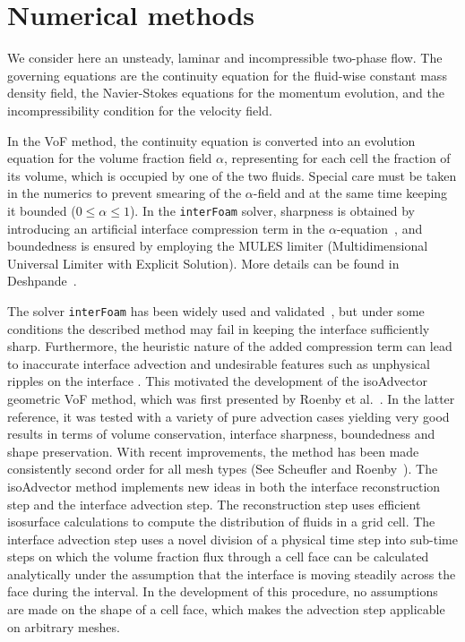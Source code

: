 \documentclass[review]{elsarticle}
\begin{document}
\section{Numerical methods}
We consider here an unsteady, laminar and incompressible two-phase flow. The governing equations are the continuity equation for the fluid-wise constant mass density field, the Navier-Stokes 
equations for the momentum evolution, and the incompressibility condition for the velocity field. 

In the VoF method, the continuity equation is converted into an evolution equation for the volume fraction field $\alpha$, representing for each cell the fraction of its volume, which is occupied by one of the two fluids. Special care must be taken in the numerics to prevent smearing of the $\alpha$-field and at the same time keeping it bounded ($0\leq \alpha\leq 1$). In the \verb|interFoam| solver, sharpness is obtained by introducing an artificial interface compression term in the $\alpha$-equation~\cite{Weller2008}, and boundedness is ensured by employing the MULES limiter (Multidimensional Universal Limiter with Explicit Solution). More details can be found in Deshpande~\cite{Deshpande2012}.

The solver \verb+interFoam+ has been widely used and validated~\cite{MARSCHALL2012,RAEINI2012,HOANG2013,BILGER2017}, but under some conditions the described method may fail in keeping the interface sufficiently sharp. Furthermore, the heuristic nature of the added compression term can lead to inaccurate interface advection and undesirable features such as unphysical ripples on the interface \cite{roenby_new_2017,roenby_isoadvector:_2018}. This motivated the development of the isoAdvector geometric VoF method, which was first presented by Roenby et al.~\cite{Roenby160405}. In the latter reference, it was tested with a variety of pure advection cases yielding very good results in terms of volume conservation, interface sharpness, boundedness and shape preservation. 
With recent improvements, the method has been made consistently second order for all mesh types (See Scheufler and Roenby~\cite{Scheufler2018}). The isoAdvector method implements new ideas in both the interface reconstruction step and the interface advection step.
The reconstruction step uses efficient isosurface calculations to compute the distribution
of fluids in a grid cell. The interface advection step uses a novel division of
a physical time step into sub-time steps on which the volume fraction flux through a 
cell face can be calculated analytically under the assumption that the interface is moving 
steadily across the face during the interval. In the development of this procedure, 
no assumptions are made on the shape of a cell face, which makes the advection step 
applicable on arbitrary meshes.
\end{document}
